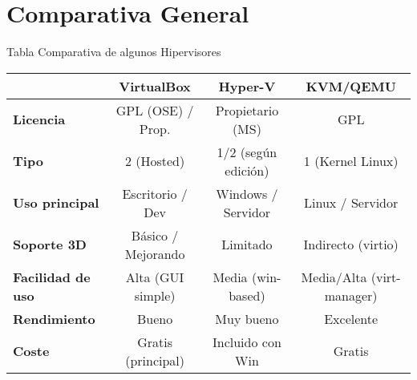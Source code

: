 \documentclass{beamer}
\begin{document}
\section{Comparativa General}

\scriptsize %
\begin{frame}{Tabla Comparativa de algunos Hipervisores}
	\begin{center}
		\scriptsize %
		\begin{tabular}{l c c c}
			\toprule
			& \textbf{VirtualBox} & \textbf{Hyper-V} & \textbf{KVM/QEMU} \\
			\midrule
			\textbf{Licencia} & GPL (OSE) / Prop. & Propietario (MS) & GPL  \\
			\textbf{Tipo} & 2 (Hosted) & 1/2 (según edición) & 1 (Kernel Linux) \\
			\textbf{Uso principal} & Escritorio / Dev & Windows / Servidor & Linux / Servidor \\
			\textbf{Soporte 3D} & Básico / Mejorando & Limitado & Indirecto (virtio) \\
			\textbf{Facilidad de uso} & Alta (GUI simple) & Media (win-based) & Media/Alta (virt-manager) \\
			\textbf{Rendimiento} & Bueno & Muy bueno & Excelente \\
			\textbf{Coste} & Gratis (principal) & Incluido con Win & Gratis \\
			\bottomrule
		\end{tabular}
	\end{center}
\end{frame}
\end{document}
